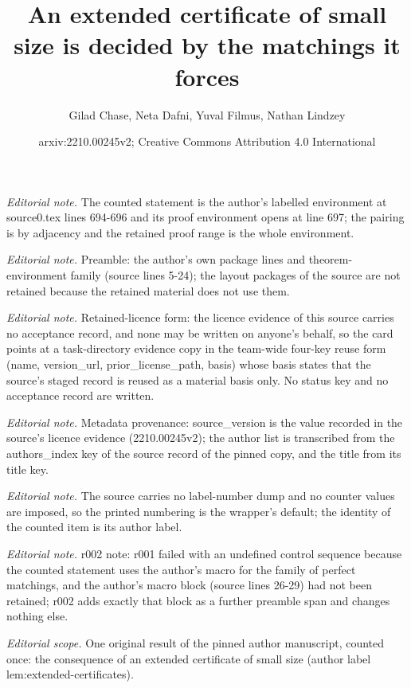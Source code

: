 \documentclass[10pt,a4paper]{article}
\title{An extended certificate of small size is decided by the matchings it forces}
\author{Gilad Chase, Neta Dafni, Yuval Filmus, Nathan Lindzey}
\date{arxiv:2210.00245v2; Creative Commons Attribution 4.0 International}
\theoremstyle{definition}
\begin{document}
\maketitle
\noindent\textit{Editorial note.} The counted statement is the author's labelled environment at source0.tex lines 694-696 and its proof environment opens at line 697; the pairing is by adjacency and the retained proof range is the whole environment.\par\medskip
\noindent\textit{Editorial note.} Preamble: the author's own package lines and theorem-environment family (source lines 5-24); the layout packages of the source are not retained because the retained material does not use them.\par\medskip
\noindent\textit{Editorial note.} Retained-licence form: the licence evidence of this source carries no acceptance record, and none may be written on anyone's behalf, so the card points at a task-directory evidence copy in the team-wide four-key reuse form (name, version\_url, prior\_license\_path, basis) whose basis states that the source's staged record is reused as a material basis only. No status key and no acceptance record are written.\par\medskip
\noindent\textit{Editorial note.} Metadata provenance: source\_version is the value recorded in the source's licence evidence (2210.00245v2); the author list is transcribed from the authors\_index key of the source record of the pinned copy, and the title from its title key.\par\medskip
\noindent\textit{Editorial note.} The source carries no label-number dump and no counter values are imposed, so the printed numbering is the wrapper's default; the identity of the counted item is its author label.\par\medskip
\noindent\textit{Editorial note.} r002 note: r001 failed with an undefined control sequence because the counted statement uses the author's macro for the family of perfect matchings, and the author's macro block (source lines 26-29) had not been retained; r002 adds exactly that block as a further preamble span and changes nothing else.\par\medskip
\noindent\textit{Editorial scope.} One original result of the pinned author manuscript, counted once: the consequence of an extended certificate of small size (author label lem:extended-certificates).\par\medskip
\end{document}
